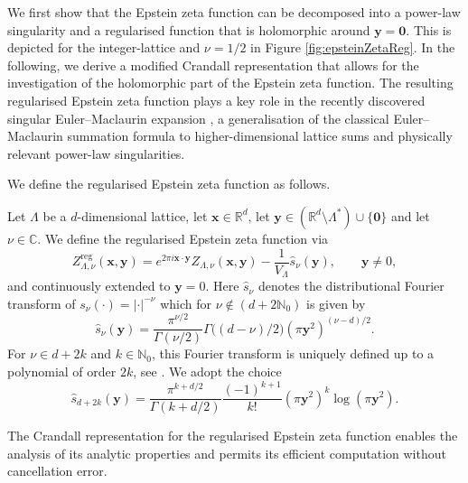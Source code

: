\documentclass[]{amsart}
\newcommand{\new}[1]{#1}
\newcommand{\zeps}[3]{\new{Z_{#1} (#2, #3)}}
\newcommand{\zepsr}[3]{\new{Z_{#1}^{\mathrm{reg}}(#2, #3)}}
\numberwithin{mythm}{section}
\begin{document}
We \new{first} show that the  Epstein zeta function can be decomposed into a power-law singularity and a regularised function that is holomorphic around $\bm y = \bm 0$. 
This is depicted for the integer-lattice and $\nu=1/2$ in 
Figure \ref{fig:epsteinZetaReg}. 
In the following, we derive a modified Crandall representation that allows for the investigation of the holomorphic part of the Epstein zeta function.
The resulting regularised Epstein zeta function plays a key role in the recently discovered singular Euler--Maclaurin expansion \cite{buchheit2022singular}, a generalisation of the classical Euler--Maclaurin summation formula to higher-dimensional lattice sums and physically relevant power-law singularities. 

We define the regularised Epstein zeta function as follows.

\begin{definition}
\label{def:epstienreg}
Let $\Lambda$ be a $d$-dimensional lattice, let $\bm x \in\mathds{R}^d$, let
$\bm y \in (\mathds R^d\setminus\Lambda^*)\cup\{\bm 0\}$ and let $\nu \in \mathds{C}$.
We define the regularised Epstein zeta function via 
\[\zepsr{\Lambda, \nu}{\bm x}{\bm y} = e^{2 \pi  i  \bm x \cdot \bm y} \zeps{\Lambda, \nu}{\bm x}{\bm y} - \frac{1}{V_\Lambda} \hat{s}_\nu(\bm y),\qquad \bm y\neq 0,\]
and continuously extended to $\bm y = 0$. Here $\hat s_\nu$ denotes the distributional Fourier transform of $s_\nu(\cdot)=\vert \bm \cdot\vert^{-\nu}$ which for $\nu \not\in (d+2\mathds N_0)$ is given by
\[\hat{s}_\nu(\bm y) = \frac{\pi^{\nu/2}}{\Gamma(\nu/2)}\Gamma\big((d-\nu)/2\big)  (\pi \bm y^2)^{(\nu - d)/2}.
\]
For $\nu\in d+ 2k$ and $k\in\mathds N_0$, this Fourier transform is uniquely defined up to a polynomial of order $2k$, see \cite{hormander2003analysisI}. We adopt the choice
\[
\hat s_{d+2k}(\bm y)= \frac{\pi^{k+d/2}}{\Gamma(k+d/2)}\frac{(-1)^{k+1}}{k!} ( \pi \bm y^2 )^{k} \log (\pi  \bm y^{2}).
\]
\end{definition}

The Crandall representation for the regularised Epstein zeta function
enables the analysis of its analytic properties and permits its efficient computation
without cancellation error.
\end{document}
